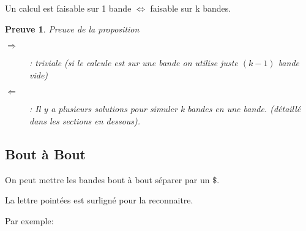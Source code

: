 \documentclass{article}
\theoremstyle{plain}
\theoremstyle{nonumberplain}
\newtheorem{prf}{Preuve}
\begin{document}
\newpage
\begin{Proposition}
  Un calcul est faisable sur 1 bande $\Leftrightarrow$ faisable sur k bandes.
\end{Proposition}

\begin{prf} Preuve de la proposition
  \begin{description}
    \item[$\Rightarrow$] : triviale (si le calcule 
      est sur une bande on utilise juste $(k-1)$ bande vide)

    \item[$\Leftarrow$] : Il y a plusieurs solutions pour simuler k bandes 
      en une bande. (détaillé dans les sections en dessous).
  \end{description}
\end{prf}

\subsection{Bout à Bout}

  On peut mettre les bandes bout à bout séparer par un $\$$.

  La lettre pointées est surligné pour la reconnaitre.

  Par exemple:

\end{document}
